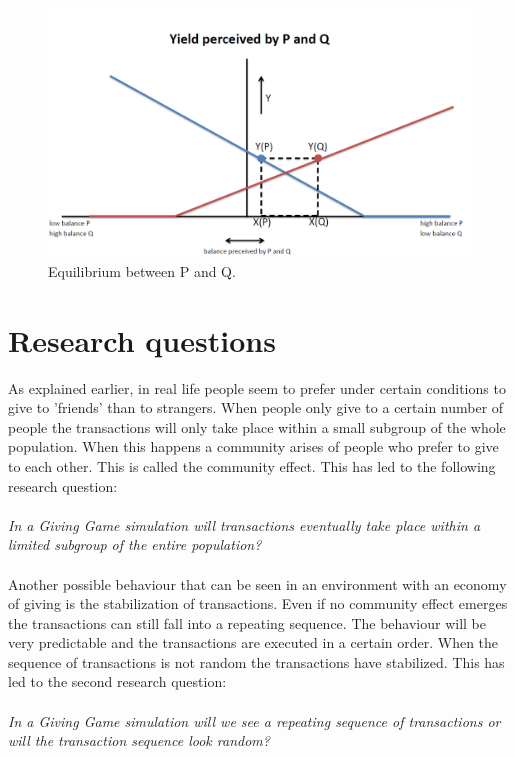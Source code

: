 \documentclass[twoside,openright]{uva-bachelor-thesis}
\begin{document}
\begin{figure}[h!]
\centering
\includegraphics[scale=0.4]{YieldCurves/yieldcurve_PQ_equilibrium}
\caption{Equilibrium between P and Q.}
\end{figure}

\clearpage
\section{Research questions}
As explained earlier, in real life people seem to prefer under certain conditions to give to 'friends' than to strangers. When people only give to a certain number of people the transactions will only take place within a small subgroup of the whole population. When this happens a community arises of people who prefer to give to each other. This is called the community effect. This has led to the following research question:
\\
\\
\textit{In a Giving Game simulation will transactions eventually take place within a limited subgroup of the entire population?}
\\
\\
Another possible behaviour that can be seen in an environment with an economy of giving is the stabilization of transactions. Even if no community effect emerges the transactions can still fall into a repeating sequence. The behaviour will be very predictable and the transactions are executed in a certain order. When the sequence of transactions is not random the transactions have stabilized. This has led to the second research question:
\\
\\
\textit{In a Giving Game simulation will we see a repeating sequence of transactions or will the transaction sequence look random?}
\end{document}
